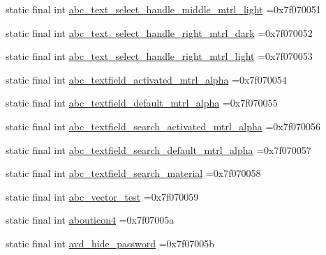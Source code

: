 \begin{DoxyCompactItemize}
\item 
static final int \mbox{\hyperlink{classcom_1_1example_1_1trainawearapplication_1_1_r_1_1drawable_a3894c6f43aa2f12cb24ee4c7a68eaa0a}{abc\+\_\+text\+\_\+select\+\_\+handle\+\_\+middle\+\_\+mtrl\+\_\+light}} =0x7f070051
\item 
static final int \mbox{\hyperlink{classcom_1_1example_1_1trainawearapplication_1_1_r_1_1drawable_ad16cec8fd003397b301b52ec05d61c27}{abc\+\_\+text\+\_\+select\+\_\+handle\+\_\+right\+\_\+mtrl\+\_\+dark}} =0x7f070052
\item 
static final int \mbox{\hyperlink{classcom_1_1example_1_1trainawearapplication_1_1_r_1_1drawable_a5270134b3a4a1a8a49c269ae94b6c9d5}{abc\+\_\+text\+\_\+select\+\_\+handle\+\_\+right\+\_\+mtrl\+\_\+light}} =0x7f070053
\item 
static final int \mbox{\hyperlink{classcom_1_1example_1_1trainawearapplication_1_1_r_1_1drawable_a0e62c9f99821a54a2eb9fc6c73c28713}{abc\+\_\+textfield\+\_\+activated\+\_\+mtrl\+\_\+alpha}} =0x7f070054
\item 
static final int \mbox{\hyperlink{classcom_1_1example_1_1trainawearapplication_1_1_r_1_1drawable_a2012fea0781fb3f8461d0d6d585626dd}{abc\+\_\+textfield\+\_\+default\+\_\+mtrl\+\_\+alpha}} =0x7f070055
\item 
static final int \mbox{\hyperlink{classcom_1_1example_1_1trainawearapplication_1_1_r_1_1drawable_af8d1857e96072a182aaf814f429246fc}{abc\+\_\+textfield\+\_\+search\+\_\+activated\+\_\+mtrl\+\_\+alpha}} =0x7f070056
\item 
static final int \mbox{\hyperlink{classcom_1_1example_1_1trainawearapplication_1_1_r_1_1drawable_a8b4aadd8fc5b1ffad95c3e7f2e5f0eb5}{abc\+\_\+textfield\+\_\+search\+\_\+default\+\_\+mtrl\+\_\+alpha}} =0x7f070057
\item 
static final int \mbox{\hyperlink{classcom_1_1example_1_1trainawearapplication_1_1_r_1_1drawable_ac3356f0abb46429233127f550f7f6b74}{abc\+\_\+textfield\+\_\+search\+\_\+material}} =0x7f070058
\item 
static final int \mbox{\hyperlink{classcom_1_1example_1_1trainawearapplication_1_1_r_1_1drawable_a0f492b0668df98b638cd943e37b44091}{abc\+\_\+vector\+\_\+test}} =0x7f070059
\item 
static final int \mbox{\hyperlink{classcom_1_1example_1_1trainawearapplication_1_1_r_1_1drawable_ac021a859ce178c381fb6222b8925014e}{abouticon4}} =0x7f07005a
\item 
static final int \mbox{\hyperlink{classcom_1_1example_1_1trainawearapplication_1_1_r_1_1drawable_a015d6e911f6f5203c61b734a89c70e88}{avd\+\_\+hide\+\_\+password}} =0x7f07005b

\end{DoxyCompactItemize}
